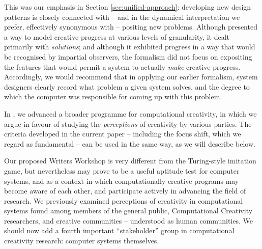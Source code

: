 \documentclass{llncs}
\begin{document}
This was our emphasis in Section \ref{sec:unified-approach}:
developing new design patterns is closely connected with -- and in the
dynamical interpretation we prefer, effectively synonymous with --
positing new problems.  Although \cite{colton-assessingprogress}
presented a way to model creative progress at various levels of
granularity, it dealt primarily with \emph{solutions}; and although it
exhibited progress in a way that would be recognised by impartial
observers, the formalism did not focus on expositing the features that
would permit a system to actually \emph{make} creative progress.
Accordingly, we would recommend that in applying our earlier
formalism, system designers clearly record what problem a given system
solves, and the degree to which the computer was responsible for
coming up with this problem.

In \cite{stakeholder-groups-bookchapter}, we advanced a broader
programme for computational creativity, in which we argue in favour of
studying the \emph{perceptions} of creativity by various parties.  The
criteria developed in the current paper -- including the focus shift,
which we regard as fundamental -- can be used in the same way, as we
will describe below.


Our proposed Writers Workshop is very different from the Turing-style
imitation game, but nevertheless may prove to be a useful aptitude
test for computer systems, and as a context in which computationally
creative programs may become aware of each other, and participate
actively in advancing the field of research.  We previously examined
perceptions of creativity in computational systems found among members
of the general public, Computational Creativity researchers, and
creative communities -- understood as human communities.  We should
now add a fourth important ``stakeholder'' group in computational
creativity research: computer systems themselves.
\end{document}
